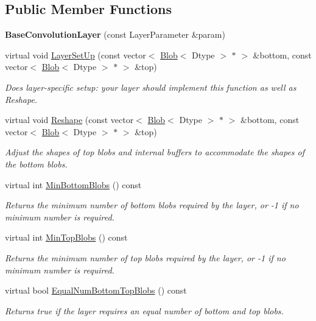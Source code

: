 \subsection*{Public Member Functions}
\begin{DoxyCompactItemize}
\item 
{\bfseries Base\+Convolution\+Layer} (const Layer\+Parameter \&param)\hypertarget{classcaffe_1_1BaseConvolutionLayer_a42f9ea86a8ede098bda11f582a31ffc1}{}\label{classcaffe_1_1BaseConvolutionLayer_a42f9ea86a8ede098bda11f582a31ffc1}

\item 
virtual void \hyperlink{classcaffe_1_1BaseConvolutionLayer_a35c6389878e77ab0a4a479e5441563cc}{Layer\+Set\+Up} (const vector$<$ \hyperlink{classcaffe_1_1Blob}{Blob}$<$ Dtype $>$ $\ast$ $>$ \&bottom, const vector$<$ \hyperlink{classcaffe_1_1Blob}{Blob}$<$ Dtype $>$ $\ast$ $>$ \&top)
\begin{DoxyCompactList}\small\item\em Does layer-\/specific setup\+: your layer should implement this function as well as Reshape. \end{DoxyCompactList}\item 
virtual void \hyperlink{classcaffe_1_1BaseConvolutionLayer_ac330e2fb166bca496edd277b0495f6eb}{Reshape} (const vector$<$ \hyperlink{classcaffe_1_1Blob}{Blob}$<$ Dtype $>$ $\ast$ $>$ \&bottom, const vector$<$ \hyperlink{classcaffe_1_1Blob}{Blob}$<$ Dtype $>$ $\ast$ $>$ \&top)
\begin{DoxyCompactList}\small\item\em Adjust the shapes of top blobs and internal buffers to accommodate the shapes of the bottom blobs. \end{DoxyCompactList}\item 
virtual int \hyperlink{classcaffe_1_1BaseConvolutionLayer_a14a2760d3eafcfce766222f80e126fbe}{Min\+Bottom\+Blobs} () const 
\begin{DoxyCompactList}\small\item\em Returns the minimum number of bottom blobs required by the layer, or -\/1 if no minimum number is required. \end{DoxyCompactList}\item 
virtual int \hyperlink{classcaffe_1_1BaseConvolutionLayer_accd0683191124da91a3667acc57e5ecd}{Min\+Top\+Blobs} () const 
\begin{DoxyCompactList}\small\item\em Returns the minimum number of top blobs required by the layer, or -\/1 if no minimum number is required. \end{DoxyCompactList}\item 
virtual bool \hyperlink{classcaffe_1_1BaseConvolutionLayer_add4567680b9466cbae5804da6a76e2ee}{Equal\+Num\+Bottom\+Top\+Blobs} () const 
\begin{DoxyCompactList}\small\item\em Returns true if the layer requires an equal number of bottom and top blobs. \end{DoxyCompactList}\end{DoxyCompactItemize}

